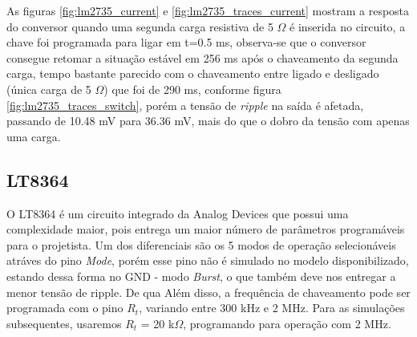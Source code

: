 \noindent
\begin{minipage}{\linewidth}
\label{fig:lm2735_traces_current}
\end{minipage}

As figuras \ref{fig:lm2735_current} e \ref{fig:lm2735_traces_current} mostram a resposta do conversor quando uma segunda carga resistiva de 5 $\Omega$ é inserida no circuito, a chave foi programada para ligar em t=0.5 ms, observa-se que o conversor consegue retomar a situação estável em 256 ms após o chaveamento da segunda carga, tempo bastante parecido com o chaveamento entre ligado e desligado (única carga de 5 $\Omega$) que foi de 290 ms, conforme figura \ref{fig:lm2735_traces_switch}, porém a tensão de \textit{ripple} na saída é afetada, passando de 10.48 mV para 36.36 mV, mais do que o dobro da tensão com apenas uma carga.

\subsection*{LT8364}

O LT8364 \cite{lt8364_datasheet} é um circuito integrado da Analog Devices que possui uma complexidade maior, pois entrega um maior número de parâmetros programáveis para o projetista. Um dos diferenciais são os 5 modos de operação selecionáveis atráves do pino \textit{Mode}, porém esse pino não é simulado no modelo disponibilizado, estando dessa forma no GND - modo \textit{Burst}, o que também deve nos entregar a menor tensão de ripple. De qua
Além disso, a frequência de chaveamento pode ser programada com o pino $R_{t}$, variando entre 300 kHz e 2 MHz. Para as simulações subsequentes, usaremos $R_{t}$ = 20 k$\Omega$, programando para operação com 2 MHz.

